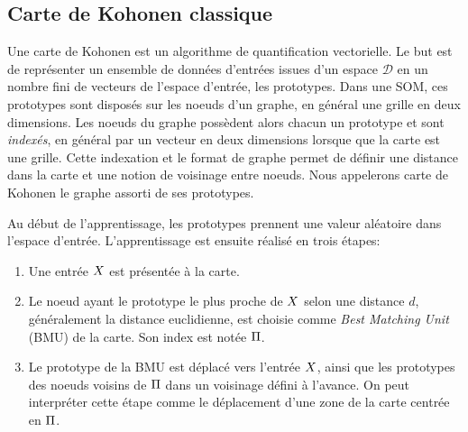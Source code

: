 \documentclass[../main]{subfiles}
\begin{document}
\subsection{Carte de Kohonen classique}

Une carte de Kohonen est un algorithme de quantification vectorielle. Le but est de représenter un ensemble de données d'entrées issues d'un espace $\mathcal{D}$ en un nombre fini de vecteurs de l'espace d'entrée, les prototypes. Dans une SOM, ces prototypes sont disposés sur les noeuds d'un graphe, en général une grille en deux dimensions.
Les noeuds du graphe possèdent alors chacun un prototype et sont \emph{indexés}, en général par un vecteur en deux dimensions lorsque que la carte est une grille.
Cette indexation et le format de graphe permet de définir une distance dans la carte et une notion de voisinage entre noeuds.
Nous appelerons carte de Kohonen le graphe assorti de ses prototypes.

Au début de l'apprentissage, les prototypes prennent une valeur aléatoire dans l'espace d'entrée. 
L'apprentissage est ensuite réalisé en trois étapes:
\begin{enumerate}
\item Une entrée $X$ est présentée à la carte.
\item Le noeud ayant le prototype le plus proche de $X$ selon une distance $d$, généralement la distance euclidienne, est choisie comme \emph{Best Matching Unit} (BMU) de la carte. Son index est notée $\Pi$.
\item Le prototype de la BMU est déplacé vers l'entrée $X$, ainsi que les prototypes des noeuds voisins de $\Pi$ dans un voisinage défini à l'avance. On peut interpréter cette étape comme le déplacement d'une zone de la carte centrée en $\Pi$.
\end{enumerate}
\end{document}
